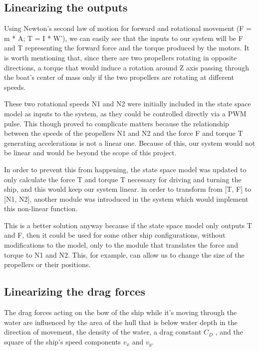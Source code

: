 
\subsection{Linearizing the outputs}

Using Newton's second law of motion for forward  and rotational movement (F = m * A; T = I * W'), we can easily see that the inputs to our system will be F and T representing the forward force and the torque produced by the motors. It is worth mentioning that, since there are two propellers rotating in opposite directions, a torque that would induce a rotation around Z axis passing through the boat's center of mass only if the two propellers are rotating at different speeds.

These two rotational speeds N1 and N2 were initially included in the state space model as inputs to the system, as they could be controlled directly via a PWM pulse. This though proved to complicate matters because the relationship between the speeds of the propellers N1 and N2 and the force F and torque T generating accelerations is not a linear one. Because of this, our system would not be linear and would be beyond the scope of this project. 


In order to prevent this from happening, the state space model was updated to only calculate the force T and torque T necessary for driving and turning the ship, and this would keep our system linear. in order to transform from [T, F] to [N1, N2], another module was introduced in the system which would implement this non-linear function. 

This is a better solution anyway because if the state space model only outputs T and F, then it could be used for some other ship configurations, without modifications to the model, only to the module that translates the force and torque to N1 and N2. This, for example, can allow us to change the size of the propellers or their positions.

\subsection{Linearizing the drag forces}

The drag forces acting on the bow of the ship while it's moving through the water are influenced by the area of the hull that is below water depth in the direction of movement, the density of the water, a drag constant $ C_{D} $ , and the square of the ship's speed components $ v_{x} $ and $ v_{y} $. 

